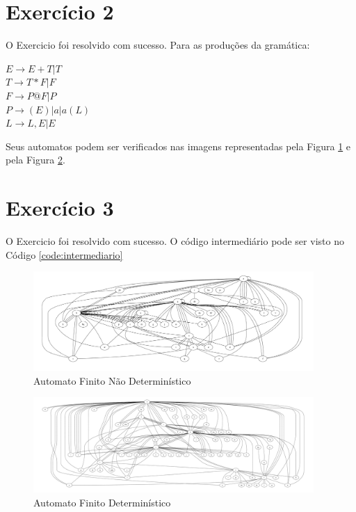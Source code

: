 \documentclass[a4paper, 10pt]{article}
\begin{document}
\section*{Exercício 2}

O Exercicio foi resolvido com sucesso. Para as produções da gramática:
\begin{center}
    $E  \to  E + T | T$ \\
    $T  \to  T * F | F$ \\
    $F  \to  P @ F | P$ \\
    $P  \to  ( E ) | a | a ( L )$ \\
    $L  \to  L , E | E$ \\
\end{center}
Seus automatos podem ser verificados nas imagens representadas pela Figura \ref{fig:naodeterministico} e pela Figura \ref{fig:deterministico}.

\section*{Exercício 3}

O Exercicio foi resolvido com sucesso. O código intermediário pode ser visto no Código \ref{code:intermediario}



\begin{figure}[H]
  \begin{center}
  \includegraphics[width=4.2in]{./../output/nao_deterministico.png}
  \caption{Automato Finito Não Determinístico}
  \label{fig:naodeterministico}
  \end{center}
\end{figure}

\begin{figure}[H]
  \begin{center}
  \includegraphics[width=4.2in]{./../output/deterministico.png}
  \caption{Automato Finito Determinístico}
  \label{fig:deterministico}
  \end{center}
\end{figure}

\end{document}
